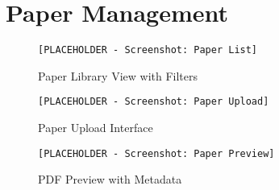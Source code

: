 \section{Paper Management}
\label{sec:screenshots-papers}

\begin{figure}[H]
\centering
\texttt{[PLACEHOLDER - Screenshot: Paper List]}
\caption{Paper Library View with Filters}
\label{fig:screenshot-paper-list}
\end{figure}

\begin{figure}[H]
\centering
\texttt{[PLACEHOLDER - Screenshot: Paper Upload]}
\caption{Paper Upload Interface}
\label{fig:screenshot-paper-upload}
\end{figure}

\begin{figure}[H]
\centering
\texttt{[PLACEHOLDER - Screenshot: Paper Preview]}
\caption{PDF Preview with Metadata}
\label{fig:screenshot-paper-preview}
\end{figure}

